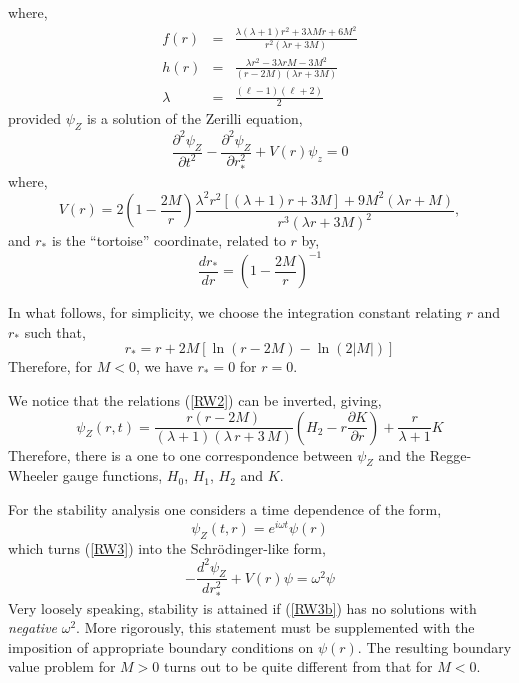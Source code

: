 \documentclass[12pt,aps,floats,showpacs,amssymb,tightenlines]{revtex4}
\begin{document}
where,
\begin{eqnarray}
\label{RW2a}
f(r) & = &  \frac{\lambda(\lambda+1)r^2+3 \lambda M r + 6 M^2}{r^2(\lambda r + 3 M)}\nonumber \\
h(r) & = &  \frac{\lambda r^2 - 3 \lambda r M -3 M^2}{(r-2M)(\lambda r + 3M)}\nonumber \\
\lambda & = &  \frac{(\ell-1)(\ell+2)}{2}
\end{eqnarray}
provided $\psi_Z$ is a solution of the Zerilli equation,
\begin{equation}
\label{RW3}
\frac{\partial^2 \psi_Z}{\partial t^2}-\frac{\partial^2 \psi_Z}{\partial r_*^2} +V(r) \psi_z = 0
\end{equation}
where,
\begin{equation}
\label{poten1}
V(r) = 2 \left(1 -\frac{2 M}{ r}\right) {\frac{ \lambda^2 r^2
\left[(\lambda+1) r + 3 M \right] + 9 M^2 (\lambda r +M)}{ r^3
(\lambda r + 3 M)^2} } ,
\end{equation}
and $r_*$ is the ``tortoise'' coordinate, related to $r$ by,
\begin{equation}
\label{RW4}
\frac{dr_*}{dr}=\left(1-\frac{2M}{r}\right)^{-1}
\end{equation}

In what follows, for simplicity, we choose the integration constant relating $r$ and $r_*$ such that,
\begin{equation}
\label{RW4a}
r_* = r +2 M \left[\ln (r-2M) -\ln(2|M|)\right]
\end{equation}
Therefore, for $M<0$, we have $ r_*=0$ for $r=0$.

We notice that the relations (\ref{RW2}) can be inverted, giving,
\begin{equation}
\label{RW3a}
\psi_Z(r,t)  = \frac {r (r-2M)}{ ( \lambda+1 )  ( \lambda
\,r+3\,M ) } \left(H_2
 - r  \frac {\partial K}{\partial r}
\right)
    +\frac{r}{\lambda+1} K
\end{equation}
Therefore, there is a one to one correspondence between $\psi_Z$ and
the Regge-Wheeler gauge functions, $H_0$, $H_1$, $H_2$ and $K$.

For the stability analysis one considers a time dependence of the form,
\begin{equation}
\label{psitopsi1}
\psi_Z(t,r)=e^{i \omega t} \psi(r)
\end{equation}
which turns (\ref{RW3}) into the Schr\"odinger-like form,
\begin{equation}
\label{RW3b}
 -\frac{d^2 \psi_Z}{d r_*^2} +V(r) \psi = \omega^2  \psi
\end{equation}
Very loosely speaking, stability is attained if (\ref{RW3b}) has no solutions with {\em negative}
 $\omega^2$. More rigorously, this statement must be supplemented with the imposition of appropriate
 boundary conditions on $\psi(r)$. The resulting boundary value problem for $M > 0$ turns out to be
  quite different from that for $M<0$.
\end{document}
